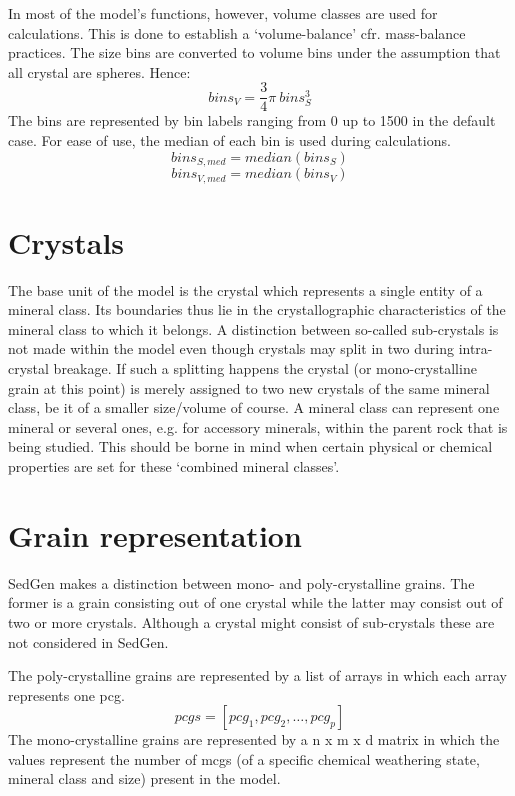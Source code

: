 In most of the model's functions, however, volume classes are used for calculations. %
This is done to establish a `volume-balance' cfr. mass-balance practices. %
The size bins are converted to volume bins under the assumption that all crystal are spheres. %
Hence:
    \begin{equation}
        bins_{V} = \frac{3}{4} \pi\ bins_{S}^{3}
    \end{equation}
The bins are represented by bin labels ranging from 0 up to 1500 in the default case. %
For ease of use, the median of each bin is used during calculations. %
    \begin{equation}
        bins_{S, med} = median(bins_{S})
    \end{equation}
    \begin{equation}
        bins_{V, med} = median(bins_{V})
    \end{equation}


\section{Crystals}
The base unit of the model is the crystal which represents a single entity of a mineral class. %
Its boundaries thus lie in the crystallographic characteristics of the mineral class to which it belongs. %
A distinction between so-called sub-crystals is not made within the model even though crystals may split in two during intra-crystal breakage. %
If such a splitting happens the crystal (or mono-crystalline grain at this point) is merely assigned to two new crystals of the same mineral class, be it of a smaller size/volume of course. %
A mineral class can represent one mineral or several ones, e.g. for accessory minerals, within the parent rock that is being studied. %
This should be borne in mind when certain physical or chemical properties are set for these `combined mineral classes'. %



\section{Grain representation}
SedGen makes a distinction between mono- and poly-crystalline grains. %
The former is a grain consisting out of one crystal while the latter may consist out of two or more crystals. %
Although a crystal might consist of sub-crystals these are not considered in SedGen. %

The poly-crystalline grains are represented by a list of arrays in which each array represents one pcg.
\begin{equation}
    pcgs = [pcg_1, pcg_2, \ldots, pcg_p]
\end{equation}
The mono-crystalline grains are represented by a n x m x d matrix in which the values represent the number of mcgs (of a specific chemical weathering state, mineral class and size) present in the model. %

